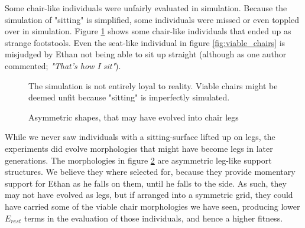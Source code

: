 Some chair-like individuals were unfairly evaluated in simulation. Because the
simulation of "sitting" is simplified, some individuals were missed or even
toppled over in simulation. Figure \ref{fig:footstools} shows some chair-like
individuals that ended up as strange footstools. Even the seat-like individual
in figure \ref{fig:viable_chairs} is misjudged by Ethan not being able to sit up
straight (although as one author commented; \emph{"That's how I sit"}).

\begin{figure}[ht]
	\centering
	 \hfil
	\caption{The simulation is not entirely loyal to reality. Viable chairs
	might be deemed unfit because "sitting" is imperfectly simulated.}
	\label{fig:footstools}
\end{figure}

\begin{figure}[h]
\centering
{}
\hfil
{}
\caption{Asymmetric shapes, that may have evolved into chair legs}
\label{fig:chair_legs}
\end{figure}

While we never saw individuals with a sitting-surface lifted up on legs, the
experiments did evolve morphologies that might have become legs in later
generations. The morphologies in figure \ref{fig:chair_legs} are asymmetric
leg-like support structures. We believe they where selected for, because they
provide momentary support for Ethan as he falls on them, until he falls to the
side. As such, they may not have evolved as legs, but if arranged into a
symmetric grid, they could have carried some of the viable chair morphologies we
have seen, producing lower $E_{rest}$ terms in the evaluation of those
individuals, and hence a higher fitness.
